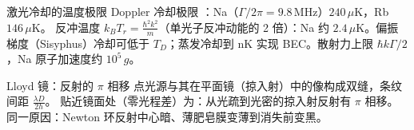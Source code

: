 \begin{结论}{激光冷却的温度极限}
Doppler 冷却极限 ：Na（$\Gamma/2\pi=9.8\,$MHz）$240\,\mu$K，Rb $146\,\mu$K。
反冲温度 $k_BT_r=\frac{\hbar^2k^2}{m}$（单光子反冲动能的 2 倍）：Na 约 $2.4\,\mu$K。偏振梯度（Sisyphus）冷却可低于 $T_D$；蒸发冷却到 nK 实现 BEC。散射力上限 $\hbar k\Gamma/2$，Na 原子加速度约 $10^5\,g$。
\end{结论}

\begin{结论}{Lloyd 镜：反射的 $\pi$ 相移}
点光源与其在平面镜（掠入射）中的像构成双缝，条纹间距 $\frac{\lambda D}{2h}$。
贴近镜面处（零光程差）为：从光疏到光密的掠入射反射有 $\pi$ 相移。同一原因：Newton 环反射中心暗、薄肥皂膜变薄到消失前变黑。
\end{结论}

